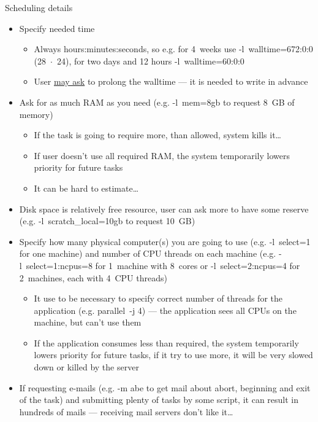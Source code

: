 \documentclass[compress, ucs, xelatex, 11pt, xcolor=x11names, aspectratio=1609,
	hyperref={
		bookmarks=true,
		unicode=true,
		colorlinks=true,
		pdftitle={HybSeq course},
		plainpages=false,
		pdfauthor={Vojtech Zeisek},
		pdfsubject={Practical processing of HybSeq target enrichment sequencing data on computing grids like MetaCentrum},
		pdfcreator={XeLaTeX},
		pdfkeywords={BASH, command line, GNU, HybSeq, Linux, MetaCentrum, sequencing shell, target enrichment},
		linkcolor=Cyan2, %
		anchorcolor=Firebrick2, %
		citecolor=Firebrick2, %
		filecolor=Firebrick2, %
		menucolor=Firebrick2, %
		urlcolor=Chartreuse2, %
		pdftex},
	url={hyphens, lowtilde} %
	]{beamer}
\renewcommand{\texttt}[1]{\colorbox{Snow4}{{\ttfamily #1}}}
\begin{document}
\begin{frame}[allowframebreaks]{Scheduling details}
	\begin{itemize}
		\item Specify needed time
		\begin{itemize}
			\item Always \texttt{hours:minutes:seconds}, so e.g. for 4~weeks use -\texttt{l~walltime=672:0:0} (28~$\cdot$~24), for two days and 12 hours -\texttt{l~walltime=60:0:0}
			\item User \href{mailto:meta@cesnet.cz}{may ask} to prolong the walltime --- it is needed to write in advance
		\end{itemize}
		\item Ask for as much RAM as you need (e.g. -\texttt{l~mem=8gb} to request 8~GB of memory)
		\begin{itemize}
			\item If the task is going to require more, than allowed, system kills it\ldots
			\item If user doesn't use all required RAM, the system temporarily lowers priority for future tasks
			\item It can be hard to estimate\ldots
		\end{itemize}
		\item Disk space is relatively free resource, user can ask more to have some reserve (e.g. -\texttt{l~scratch\_local=10gb} to request 10~GB)
		\item Specify how many physical computer(s) you are going to use (e.g. -\texttt{l~select=1} for one machine) and number of CPU threads on each machine (e.g. -\texttt{l~select=1:ncpus=8} for 1~machine with 8~cores or -\texttt{l~select=2:ncpus=4} for 2~machines, each with 4~CPU threads)
		\begin{itemize}
			\item It use to be necessary to specify correct number of threads for the application (e.g. \texttt{parallel}~-\texttt{j 4}) --- the application sees all CPUs on the machine, but can't use them
			\item If the application consumes less than required, the system temporarily lowers priority for future tasks, if it try to use more, it will be very slowed down or killed by the server
		\end{itemize}
		\item If requesting e-mails (e.g. -\texttt{m abe} to get mail about abort, beginning and exit of the task) and submitting plenty of tasks by some script, it can result in hundreds of mails --- receiving mail servers don't like it\ldots

\end{itemize}
\end{frame}
\end{document}
